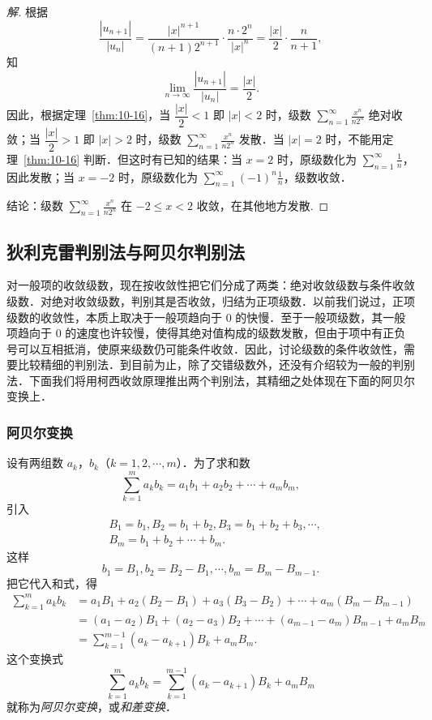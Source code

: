 \begin{proof}[解]
根据
\[
\frac{|u_{n+1}|}{|u_{n}|}=\frac{|x|^{n+1}}{(n+1)2^{n+1}}\cdot\frac{n\cdot2^{n}}{|x|^{n}}=\frac{|x|}{2}\cdot\frac{n}{n+1},
\]
知
\[
\lim_{n\to\infty}\frac{|u_{n+1}|}{|u_n|}=\frac{|x|}{2}.
\]
因此，根据定理~\ref{thm:10-16}，当 $\dfrac{|x|}{2}<1$ 即 $|x|<2$ 时，级数 $\displaystyle\sum_{n=1}^{\infty}\frac{x^n}{n2^n}$ 绝对收敛；当 $\dfrac{|x|}{2}>1$ 即 $|x|>2$ 时，级数 $\displaystyle\sum_{n=1}^{\infty}\frac{x^n}{n2^n}$ 发散．当 $|x|=2$ 时，不能用定理~\ref{thm:10-16} 判断．但这时有已知的结果：当 $x=2$ 时，原级数化为 $\displaystyle\sum_{n=1}^{\infty}\frac{1}{n}$，因此发散；当 $x=-2$ 时，原级数化为 $\displaystyle\sum_{n=1}^{\infty}(-1)^{n}\frac{1}{n}$，级数收敛．

结论：级数 $\displaystyle\sum_{n=1}^{\infty}\frac{x^{n}}{n2^{n}}$ 在 $-2\leq x<2$ 收敛，在其他地方发散.
\end{proof}

\subsection{狄利克雷判别法与阿贝尔判别法}

对一般项的收敛级数，现在按收敛性把它们分成了两类：绝对收敛级数与条件收敛级数．对绝对收敛级数，判别其是否收敛，归结为正项级数．以前我们说过，正项级数的收敛性，本质上取决于一般项趋向于 $0$ 的快慢．至于一般项级数，其一般项趋向于 $0$ 的速度也许较慢，使得其绝对值构成的级数发散，但由于项中有正负号可以互相抵消，使原来级数仍可能条件收敛．因此，讨论级数的条件收敛性，需要比较精细的判别法．到目前为止，除了交错级数外，还没有介绍较为一般的判别法．下面我们将用柯西收敛原理推出两个判别法，其精细之处体现在下面的阿贝尔变换上．

\subsubsection*{阿贝尔变换}

设有两组数 $a_{k}$，$b_{k}$（$k=1,2,\cdots,m$）．为了求和数
\[
\sum_{k=1}^{m}a_{k}b_{k}=a_{1}b_{1}+a_{2}b_{2}+\cdots+a_{m}b_{m},
\]
引入
\[
\begin{aligned}
&B_{1}=b_{1},B_{2}=b_{1}+b_{2},B_{3}=b_{1}+b_{2}+b_{3},\cdots,\\
&B_{m}=b_{1}+b_{2}+\cdots+b_{m}.
\end{aligned}
\]
这样
\[
b_{1}=B_{1},b_{2}=B_{2}-B_{1},\cdots,b_{m}=B_{m}-B_{m-1}.
\]
把它代入和式，得
\[
\begin{aligned}
\sum_{k=1}^{m}a_{k}b_{k}&=a_{1}B_{1}+a_{2}(B_{2}-B_{1})+a_{3}(B_{3}-B_{2})+\cdots+a_{m}(B_{m}-B_{m-1})\\
&=(a_{1}-a_{2})B_{1}+(a_{2}-a_{3})B_{2}+\cdots+(a_{m-1}-a_{m})B_{m-1}+a_{m}B_{m}\\
&=\sum_{k=1}^{m-1}(a_{k}-a_{k+1})B_{k}+a_{m}B_{m}.
\end{aligned}
\]
这个变换式
\[
\sum_{k=1}^{m}a_{k}b_{k}=\sum_{k=1}^{m-1}(a_{k}-a_{k+1})B_{k}+a_{m}B_{m}
\]
就称为\emph{阿贝尔变换}，或\emph{和差变换}．

